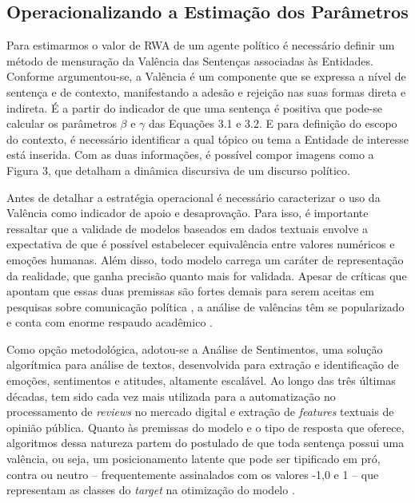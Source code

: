 \documentclass[
12pt,				%
openright,			%
twoside,			%
a4paper,			%
english,			%
french,				%
spanish,			%
brazil				%
]{abntex2}
\begin{document}
\subsection{Operacionalizando a Estimação dos Parâmetros}

Para estimarmos o valor de RWA de um agente político é necessário definir um método de mensuração da Valência das Sentenças associadas às Entidades. Conforme argumentou-se, a Valência é um componente que se expressa a nível de sentença e de contexto, manifestando a adesão e rejeição nas suas formas direta e indireta. É a partir do indicador de que uma sentença é positiva que pode-se calcular os parâmetros $\beta$ e $\gamma$ das Equações 3.1 e 3.2. E para definição do escopo do contexto, é necessário identificar a qual tópico ou tema a Entidade de interesse está inserida. Com as duas informações, é possível compor imagens como a Figura 3, que detalham a dinâmica discursiva de um discurso político.

Antes de detalhar a estratégia operacional é necessário caracterizar o uso da Valência como indicador de apoio e desaprovação. Para isso, é importante ressaltar que a validade de modelos baseados em dados textuais envolve a expectativa de que é possível estabelecer equivalência entre valores numéricos e emoções humanas. Além disso, todo modelo carrega um caráter de representação da realidade, que ganha precisão quanto mais for validada. Apesar de críticas que apontam que essas duas premissas são fortes demais para serem aceitas em pesquisas sobre comunicação política \cite{miguel2015vale}, a análise de valências têm se popularizado e conta com enorme respaudo acadêmico \cite{feres2016analise}.      

Como opção metodológica, adotou-se a Análise de Sentimentos, uma solução algorítmica para análise de textos, desenvolvida para extração e identificação de emoções, sentimentos e atitudes, altamente escalável. Ao longo das três últimas décadas, tem sido cada vez mais utilizada para a automatização no processamento de \emph{reviews} no mercado digital e extração de \emph{features} textuais de opinião pública. Quanto às premissas do modelo e o tipo de resposta que oferece, algoritmos dessa natureza partem do postulado de que toda sentença possui uma valência, ou seja, um posicionamento latente que pode ser tipificado em pró, contra ou neutro -- frequentemente assinalados com os valores -1,0 e 1 -- que representam as classes do \emph{target} na otimização do modelo \cite{serrano2015sentiment, mantyla2018evolution}.  
\end{document}
